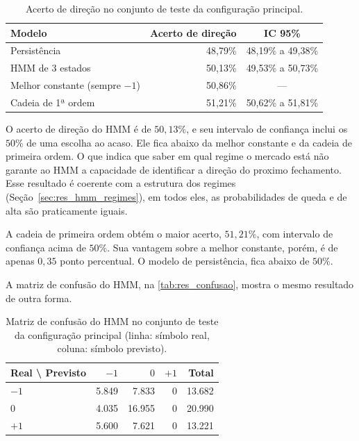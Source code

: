 \documentclass[
    12pt,                %
    openright,           %
    oneside,             %
    a4paper,             %
    english,             %
    brazil               %
]{abntex2}
\begin{document}
\begin{table}[htbp]
    \centering
    \caption{Acerto de direção no conjunto de teste da configuração principal.}
    \label{tab:res_direcao}
    \small
    \begin{tabular}{@{}lrc@{}}
        \toprule
        \textbf{Modelo} & \textbf{Acerto de direção} & \textbf{IC 95\%} \\
        \midrule
        Persistência & 48,79\% & 48,19\% a 49,38\% \\
        HMM de 3 estados & 50,13\% & 49,53\% a 50,73\% \\
        Melhor constante (sempre $-1$) & 50,86\% & --- \\
        Cadeia de 1ª ordem & 51,21\% & 50,62\% a 51,81\% \\
        \bottomrule
    \end{tabular}
\end{table}

O acerto de direção do HMM é de $50{,}13\%$, e seu intervalo de confiança inclui os $50\%$ de uma escolha ao acaso. Ele fica abaixo da melhor 
constante e da cadeia de primeira ordem. O que indica que saber em qual regime o mercado está não garante ao HMM a capacidade de identificar a direção do proximo fechamento.
Esse resultado é coerente com a estrutura dos regimes (Seção~\ref{sec:res_hmm_regimes}), em todos eles, as probabilidades
de queda e de alta são praticamente iguais.

A cadeia de primeira ordem obtém o maior acerto, $51{,}21\%$, com intervalo de confiança acima de $50\%$. Sua vantagem sobre a melhor constante, 
porém, é de apenas $0{,}35$ ponto percentual. O modelo de persistência, fica abaixo de $50\%$. 

A matriz de confusão do HMM, na \autoref{tab:res_confusao}, mostra o mesmo resultado de outra forma.

\begin{table}[htbp]
    \centering
    \caption{Matriz de confusão do HMM no conjunto de teste da configuração principal (linha: símbolo real, coluna: símbolo previsto).}
    \label{tab:res_confusao}
    \small
    \begin{tabular}{@{}lrrrr@{}}
        \toprule
        \textbf{Real \textbackslash{} Previsto} & \textbf{$-1$} & \textbf{$0$} & \textbf{$+1$} & \textbf{Total} \\
        \midrule
        $-1$ & 5.849 & 7.833 & 0 & 13.682 \\
        $0$  & 4.035 & 16.955 & 0 & 20.990 \\
        $+1$ & 5.600 & 7.621 & 0 & 13.221 \\
        \bottomrule
    \end{tabular}
\end{table}
\end{document}
